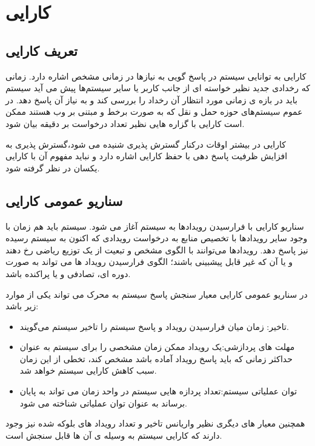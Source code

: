 \chapter{کارایی}
\section{تعریف کارایی}
کارایی به توانایی سیستم در پاسخ گویی به نیازها در زمانی مشخص اشاره دارد. زمانی که رخدادی جدید نظیر خواسته ای از جانب کاربر یا سایر سیستم‌ها پیش می آید سیستم باید در بازه ی زمانی مورد انتظار آن رخداد را بررسی کند و به نیاز آن پاسخ دهد. در عموم سیستم‌های حوزه حمل و نقل که به صورت برخط و مبتنی بر وب هستند ممکن است کارایی با گزاره هایی نظیر تعداد درخواست بر دقیقه بیان شود.

کارایی در بیشتر اوقات درکنار گسترش پذیری شنیده می شود،‌گسترش پذیری به افزایش ظرفیت پاسخ دهی با حفظ کارایی اشاره دارد و نباید مفهوم آن با کارایی یکسان در نظر گرفته شود.
\section{سناریو عمومی کارایی}
سناریو کارایی با فرارسیدن رویداد‌ها به سیستم آغاز می شود. سیستم باید هم زمان با وجود سایر رویدادها با تخصیص منابع به درخواست رویدادی که اکنون به سیستم رسیده نیز پاسخ دهد.
رویدادها می‌توانند با الگوی مشخص و تبعیت از یک توزیع ریاضی رخ دهند و یا آن که غیر قابل پیشبینی باشند؛ ‌الگوی فرارسیدن رویداد ها می تواند به صورت دوره ای، تصادفی و یا پراکنده باشد.

در سناریو عمومی کارایی معیار سنجش پاسخ سیستم به محرک می تواند یکی از موارد زیر باشد:
\begin{itemize}
\item
تاخیر: زمان میان فرارسیدن رویداد و پاسخ سیستم را تاخیر سیستم می‌گویند.
\item
مهلت های پردازشی:یک رویداد ممکن زمان مشخصی را برای سیستم به عنوان حداکثر زمانی که باید پاسخ رویداد آماده باشد مشخص کند،‌ تخطی از این زمان سبب کاهش کارایی سیستم خواهد شد.
\item
توان عملیاتی سیستم:تعداد پردازه هایی سیستم در واحد زمان می تواند به پایان برساند به عنوان توان عملیاتی شناخته می شود.
\end{itemize}
همچنین معیار های دیگری نظیر واریانس تاخیر و تعداد رویداد های بلوکه شده نیز وجود دارند که کارایی سیستم به وسیله ی آن ها قابل سنجش است.

